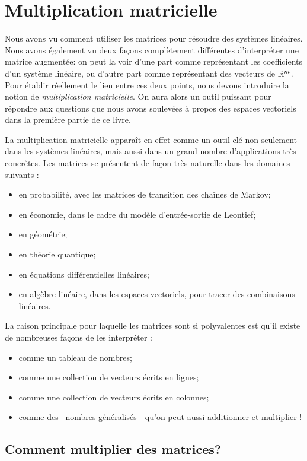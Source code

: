 \chapter{Multiplication matricielle}
\label{chapter:Fr_16-matrixmult}
  

Nous avons vu comment utiliser les matrices pour résoudre des systèmes linéaires.  Nous avons également vu deux fa\c{c}ons complètement différentes d'interpr\'eter une matrice augmentée: on peut la voir d'une part comme représentant les coefficients
d'un système linéaire, ou d'autre part comme représentant des vecteurs de $\mathbb{R}^m$.  Pour établir réellement
le lien entre ces deux points, nous devons 
introduire la notion de \emph{multiplication matricielle}. On aura alors un outil puissant pour répondre aux questions que nous avons soulevées à propos 
des espaces vectoriels dans la première partie de ce livre.

La multiplication matricielle apparaît en effet comme un outil-clé non seulement dans les systèmes linéaires, mais aussi dans un grand nombre d'applications très concrètes.  Les matrices se pr\'esentent de fa\c{c}on très naturelle dans les domaines suivants :
\begin{itemize}
\item en probabilité, avec les matrices de transition des cha\^ines de Markov; 
\item en économie, dans le cadre du modèle d'entrée-sortie de Leontief;
\item en géométrie;
\item en théorie quantique;
\item en équations différentielles linéaires;
\item en algèbre linéaire, dans les espaces vectoriels, pour tracer des combinaisons linéaires.
\end{itemize}
La raison principale pour laquelle les matrices sont si polyvalentes est qu'il existe de nombreuses
façons de les interpr\'eter :
\begin{itemize}
\item comme un tableau de nombres;
\item comme une collection de vecteurs écrits en lignes;
\item comme une collection de vecteurs écrits en colonnes;
\item comme des \og\ nombres généralisés\ \fg\ qu'on peut aussi additionner et multiplier !
\end{itemize}

\section{Comment multiplier des matrices?}

